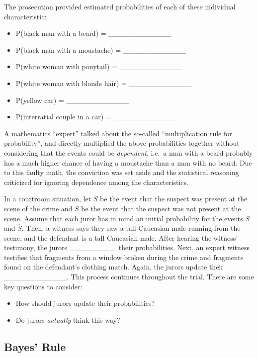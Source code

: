 \documentclass[]{book}
\providecommand{\tightlist}{%
  \setlength{\itemsep}{0pt}\setlength{\parskip}{0pt}}
\theoremstyle{definition}
\theoremstyle{definition}
\theoremstyle{remark}
\begin{document}
The prosecution provided estimated probabilities of each of these
individual characteristic:

\begin{itemize}
\tightlist
\item
  P(black man with a beard) = \_\_\_\_\_\_\_\_\_\_\_\_
\item
  P(black man with a moustache) = \_\_\_\_\_\_\_\_\_\_\_\_
\item
  P(white woman with ponytail) = \_\_\_\_\_\_\_\_\_\_\_\_
\item
  P(white woman with blonde hair) = \_\_\_\_\_\_\_\_\_\_\_\_
\item
  P(yellow car) = \_\_\_\_\_\_\_\_\_\_\_\_
\item
  P(interratial couple in a car) = \_\_\_\_\_\_\_\_\_\_\_\_
\end{itemize}

A mathematics ``expert'' talked about the so-called ``multiplication
rule for probability'', and directly multiplied the above probabilities
together without considering that the events could be \emph{dependent}.
i.e.~a man with a beard probably has a much higher chance of having a
moustache than a man with no beard. Due to this faulty math, the
conviction was set aside and the statistical reasoning criticized for
ignoring dependence among the characteristics.

In a courtroom situation, let \(S\) be the event that the suspect was
present at the scene of the crime and \(\overline{S}\) be the event that
the suspect was not present at the scene. Assume that each juror has in
mind an initial probability for the events \(S\) and \(\overline{S}\).
Then, a witness says they saw a tall Caucasian male running from the
scene, and the defendant is a tall Caucasian male. After hearing the
witness' testimony, the jurors \_\_\_\_\_\_\_\_\_ their probabilities.
Next, an expert witness testifies that fragments from a window broken
during the crime and fragments found on the defendant's clothing match.
Again, the jurors update their \_\_\_\_\_\_\_\_\_\_\_\_. This process
continues throughout the trial. There are some key questions to
consider:

\begin{itemize}
\tightlist
\item
  How should jurors update their probabilities?
\item
  Do jurors \emph{actually} think this way?
\end{itemize}

\subsection{Bayes' Rule}\label{bayes-rule}
\end{document}
